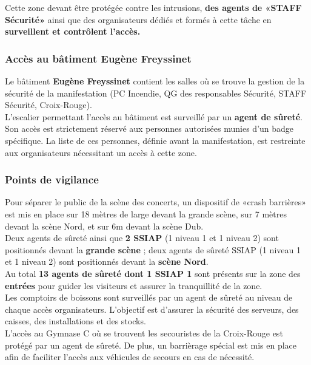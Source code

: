 \documentclass[hidelinks, paper=a4, fontsize=13pt]{report}
\begin{document}
Cette zone devant être protégée contre les intrusions, \textbf{des agents de «STAFF Sécurité»} ainsi que des organisateurs dédiés et formés à cette tâche en \textbf{surveillent et contrôlent l’accès.}

\subsubsection{Accès au bâtiment Eugène Freyssinet}
Le bâtiment \textbf{Eugène Freyssinet} contient les salles où se trouve la gestion de la sécurité de la manifestation (PC Incendie, QG des responsables Sécurité, STAFF Sécurité, Croix-Rouge). \\
L’escalier permettant l’accès au bâtiment est surveillé par un \textbf{agent de sûreté}. Son accès est strictement réservé aux personnes autorisées munies d’un badge spécifique. La liste de ces personnes, définie avant la manifestation, est restreinte aux organisateurs nécessitant un accès à cette zone.


\subsubsection{Points de vigilance}

Pour séparer le public de la scène des concerts, un dispositif de «crash barrières» est mis en place sur 18 mètres de large devant la grande scène, sur 7 mètres devant la scène Nord, et sur 6m devant la scène Dub. \\

Deux agents de sûreté ainsi que \textbf{2 SSIAP} (1 niveau 1 et 1 niveau 2) sont positionnés devant la \textbf{grande scène} ; deux agents de sûreté SSIAP (1 niveau 1 et 1 niveau 2) sont positionnés devant la \textbf{scène Nord}.\\

Au total \textbf{13 agents de sûreté dont 1 SSIAP 1} sont présents sur la zone des \textbf{entrées} pour guider les visiteurs et assurer la tranquillité de la zone.\\

Les comptoirs de boissons sont surveillés par un agent de sûreté au niveau de chaque accès  organisateurs. L’objectif est d’assurer la sécurité des serveurs, des caisses, des installations et des stocks.\\

L’accès au Gymnase C où se trouvent les secouristes de la Croix-Rouge est protégé par un agent de sûreté. De plus, un barrièrage spécial est mis en place afin de faciliter l’accès aux véhicules de secours en cas de nécessité.\\
\end{document}
